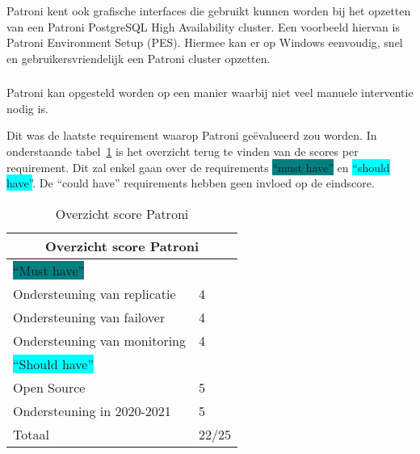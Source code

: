 \subsubsection{}
\label{subsubsec:Grafische interface}

Patroni kent ook grafische interfaces die gebruikt kunnen worden bij het opzetten van een Patroni PostgreSQL High Availability cluster. Een voorbeeld hiervan is Patroni Environment Setup (PES). Hiermee kan er op Windows eenvoudig, snel en gebruikersvriendelijk een Patroni cluster opzetten.


\subsubsection{}
\label{subsubsec:Beperkte manuele interventie}

Patroni kan opgesteld worden op een manier waarbij niet veel manuele interventie nodig is.


Dit was de laatste requirement waarop Patroni geëvalueerd zou worden. In onderstaande tabel~\ref{table:Overzicht score Patroni} is het overzicht terug te vinden van de scores per requirement. Dit zal enkel gaan over de requirements \colorbox{teal}{“must have”} en \colorbox{cyan}{“should have”}. De “could have” requirements hebben geen invloed op de eindscore.

\begin{table}[!h]
    \centering
    \begin{tabular}{ |p{6cm}||p{6cm}|  }
        \hline
        \multicolumn{2}{|c|}{Overzicht score Patroni} \\
        \hline
        \colorbox{teal}{“Must have”} & \\
        \hline
        Ondersteuning van replicatie  & 4 \\
        Ondersteuning van failover &  4 \\
        Ondersteuning van monitoring & 4 \\
        \hline
        \colorbox{cyan}{“Should have”} & \\
        \hline
        Open Source &  5 \\
        Ondersteuning in 2020-2021 & 5 \\
        \hline
        \hline
        Totaal & 22/25 \\
        \hline
    \end{tabular}
    \caption{Overzicht score Patroni}
    \label{table:Overzicht score Patroni}
\end{table}
